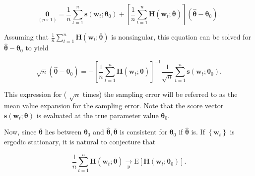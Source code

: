 \documentclass[10pt]{article}
\begin{document}
\begin{equation*}
\underset{(p \times 1)}{\mathbf{0}}=\frac{1}{n} \sum_{t=1}^{n} \mathbf{s}\left(\mathbf{w}_{t} ; \boldsymbol{\theta}_{0}\right)+\left[\frac{1}{n} \sum_{t=1}^{n} \mathbf{H}\left(\mathbf{w}_{t} ; \overline{\boldsymbol{\theta}}\right)\right]\left(\hat{\boldsymbol{\theta}}-\boldsymbol{\theta}_{0}\right) . \tag{7.3.6}
\end{equation*}


Assuming that $\frac{1}{n} \sum_{t=1}^{n} \mathbf{H}\left(\mathbf{w}_{t} ; \overline{\boldsymbol{\theta}}\right)$ is nonsingular, this equation can be solved for $\hat{\boldsymbol{\theta}}-\boldsymbol{\theta}_{0}$ to yield


\begin{equation*}
\sqrt{n}\left(\hat{\boldsymbol{\theta}}-\boldsymbol{\theta}_{0}\right)=-\left[\frac{1}{n} \sum_{t=1}^{n} \mathbf{H}\left(\mathbf{w}_{t} ; \overline{\boldsymbol{\theta}}\right)\right]^{-1} \frac{1}{\sqrt{n}} \sum_{t=1}^{n} \mathbf{s}\left(\mathbf{w}_{t} ; \boldsymbol{\theta}_{0}\right) . \tag{7.3.7}
\end{equation*}


This expression for ( $\sqrt{n}$ times) the sampling error will be referred to as the mean value expansion for the sampling error. Note that the score vector $\mathbf{s}\left(\mathbf{w}_{t} ; \boldsymbol{\theta}\right)$ is evaluated at the true parameter value $\boldsymbol{\theta}_{0}$.

Now, since $\overline{\boldsymbol{\theta}}$ lies between $\boldsymbol{\theta}_{0}$ and $\hat{\boldsymbol{\theta}}, \overline{\boldsymbol{\theta}}$ is consistent for $\boldsymbol{\theta}_{0}$ if $\hat{\boldsymbol{\theta}}$ is. If $\left\{\mathbf{w}_{t}\right\}$ is ergodic stationary, it is natural to conjecture that


\begin{equation*}
\frac{1}{n} \sum_{t=1}^{n} \mathbf{H}\left(\mathbf{w}_{t} ; \overline{\boldsymbol{\theta}}\right) \underset{\mathrm{p}}{\rightarrow} \mathrm{E}\left[\mathbf{H}\left(\mathbf{w}_{t} ; \boldsymbol{\theta}_{0}\right)\right] . \tag{7.3.8}
\end{equation*}
\end{document}
